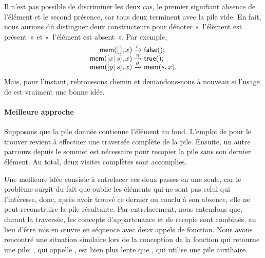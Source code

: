 Il n'est pas possible de discriminer les deux cas, le premier
signifiant absence de l'élément et le second présence, car tous deux
terminent avec la pile vide. En fait, nous aurions dû distinguer deux
constructeurs pour dénoter «~l'élément est présent~» et «~l'élément est
absent~». Par exemple,
\begin{equation*}
\begin{array}{r@{\;}l@{\;}l}
\fun{mem}(\el,x)         & \smashedrightarrow{\zeta}  & \fun{false}();\\
\fun{mem}(\cons{x}{s},x) & \smashedrightarrow{\eta}   & \fun{true}();\\
\fun{mem}(\cons{y}{s},x) & \smashedrightarrow{\theta} & \fun{mem}(s,x).
\end{array}
\end{equation*}
Mais, pour l'instant, rebroussons chemin et demandons-nous à nouveau
si l'usage de  est vraiment une bonne idée.

\paragraph{Meilleure approche}

Supposons que la pile donnée contienne l'élément au fond. L'emploi de
 pour le trouver revient à effectuer une traversée complète
de la pile. Ensuite, un autre parcours depuis le sommet est nécessaire
pour recopier la pile sans son dernier élément. Au total, deux visites
complètes sont accomplies.

Une meilleure idée consiste à entrelacer ces deux passes en une seule,
car le problème surgit du fait que  oublie les éléments qui
ne sont pas celui qui l'intéresse, donc, après avoir trouvé ce dernier
ou conclu à son absence, elle ne peut reconstruire la pile
résultante. Par entrelacement, nous entendons que, durant la
traversée, les concepts d'appartenance et de recopie sont combinés, au
lieu d'être mis en œuvre en séquence avec deux appels de
fonction. Nous avons rencontré une situation similaire lors de la
conception de la fonction qui retourne une pile: , qui
appelle , est bien plus lente que , qui utilise
une pile auxiliaire.

